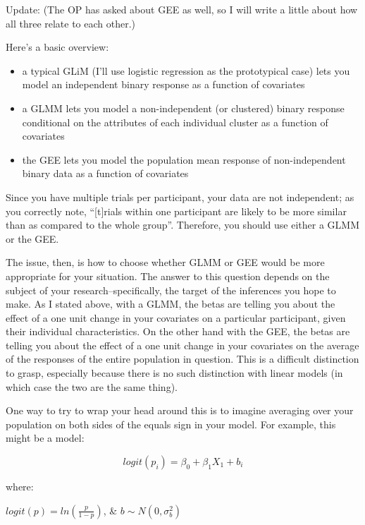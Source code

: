 \documentclass[
]{book}
\providecommand{\tightlist}{%
  \setlength{\itemsep}{0pt}\setlength{\parskip}{0pt}}
\begin{document}
Update: (The OP has asked about GEE as well, so I will write a little about how all three relate to each other.)

Here's a basic overview:

\begin{itemize}
\tightlist
\item
  a typical GLiM (I'll use logistic regression as the prototypical case) lets you model an independent binary response as a function of covariates
\item
  a GLMM lets you model a non-independent (or clustered) binary response conditional on the attributes of each individual cluster as a function of covariates
\item
  the GEE lets you model the population mean response of non-independent binary data as a function of covariates
\end{itemize}

Since you have multiple trials per participant, your data are not independent; as you correctly note, ``{[}t{]}rials within one participant are likely to be more similar than as compared to the whole group''. Therefore, you should use either a GLMM or the GEE.

The issue, then, is how to choose whether GLMM or GEE would be more appropriate for your situation. The answer to this question depends on the subject of your research--specifically, the target of the inferences you hope to make. As I stated above, with a GLMM, the betas are telling you about the effect of a one unit change in your covariates on a particular participant, given their individual characteristics. On the other hand with the GEE, the betas are telling you about the effect of a one unit change in your covariates on the average of the responses of the entire population in question. This is a difficult distinction to grasp, especially because there is no such distinction with linear models (in which case the two are the same thing).

One way to try to wrap your head around this is to imagine averaging over your population on both sides of the equals sign in your model. For example, this might be a model:

\[logit(p_i)=β_0+β_1X_1+b_i\]

where:

\(logit(p)=ln(\frac{p}{1−p})\), \& \(b∼N(0,σ_{b}^2)\)
\end{document}

